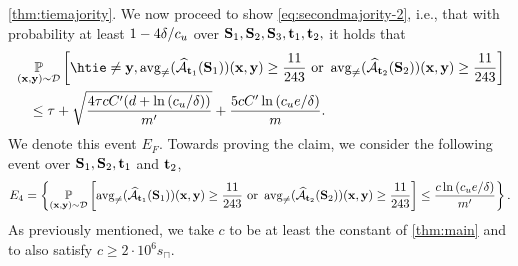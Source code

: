 \begin{proofof}{\cref{thm:tiemajority}.}
We now proceed to show \cref{eq:secondmajority-2}, i.e., that with probability at least $ 1-4\delta/c_{u} $ over $ \mathbf{S}_{1},\mathbf{S}_{2},\mathbf{S}_{3},\mathbf{t}_{1},\mathbf{t}_{2},$ it holds that
\begin{align}\label{eq:secondmajority11}
& \p_{(\rx,\ry)\sim\cD}\left[ \htie\not=\ry, \avg(\widehat{\cA}_{\rt_{1}}(\rS_{1}))(\rx,\ry)\geq \frac{11}{243} \text{ or } \avg(\widehat{\cA}_{\rt_{2}}(\rS_{2}))(\rx,\ry)\geq \frac{11}{243}\right] \nonumber \\
& \quad \leq 
    \tau+ \sqrt{\frac{4\tau cC'(d+\ln{\left(\cu/\delta \right)})}{m'}}+\frac{5cC'\ln{\left(\cu e/\delta \right)}}{m}.
\end{align}
We denote this event $ E_{F}.$ 
Towards proving the claim, we consider the following event over $ \mathbf{S}_{1},\mathbf{S}_{2},\mathbf{t}_{1}$ and $ \mathbf{t}_{2}$,
\begin{align*}
        E_{4} = \left\{ \operatorname*{\mathbb{P}}_{(\mathbf{x},\mathbf{y})\sim \mathcal{D}}\left[ \operatorname{\mathrm{avg}_{\not=}}(\widehat{\mathcal{A}}_{\mathbf{t}_{1}}(\mathbf{S}_{1}))(\mathbf{x},\mathbf{y})\geq \frac{11}{243} \text{ or } \operatorname{\mathrm{avg}_{\not=}}(\widehat{\mathcal{A}}_{\mathbf{t}_{2}}(\mathbf{S}_{2}))(\mathbf{x},\mathbf{y})\geq \frac{11}{243}\right]\leq  \frac{c\ln{\left(c_{u}e/\delta \right)}}{m'} \right\}. 
\end{align*}
As previously mentioned, we take $ c $ to be at least the constant of \cref{thm:main} and to also satisfy $ c\geq 2\cdot10^{6}s_{\sqcap} $.


\end{proofof}
